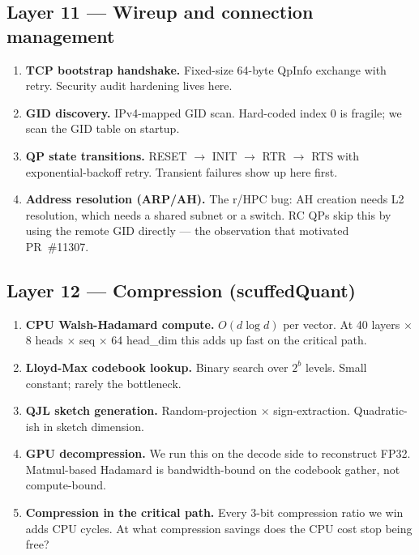 \documentclass[11pt]{article}
\begin{document}
\subsection*{Layer 11 --- Wireup and connection management}
\begin{enumerate}[resume]
\item \textbf{TCP bootstrap handshake.} Fixed-size 64-byte QpInfo
exchange with retry. Security audit hardening lives here.
\item \textbf{GID discovery.} IPv4-mapped GID scan. Hard-coded
index 0 is fragile; we scan the GID table on startup.
\item \textbf{QP state transitions.} RESET $\rightarrow$ INIT
$\rightarrow$ RTR $\rightarrow$ RTS with exponential-backoff retry.
Transient failures show up here first.
\item \textbf{Address resolution (ARP/AH).} The r/HPC bug: AH
creation needs L2 resolution, which needs a shared subnet or a
switch. RC QPs skip this by using the remote GID directly --- the
observation that motivated PR~\#11307.
\end{enumerate}

\subsection*{Layer 12 --- Compression (scuffedQuant)}
\begin{enumerate}[resume]
\item \textbf{CPU Walsh-Hadamard compute.} $O(d \log d)$ per vector.
At 40 layers $\times$ 8 heads $\times$ seq $\times$ 64 head\_dim this
adds up fast on the critical path.
\item \textbf{Lloyd-Max codebook lookup.} Binary search over
$2^b$ levels. Small constant; rarely the bottleneck.
\item \textbf{QJL sketch generation.} Random-projection $\times$
sign-extraction. Quadratic-ish in sketch dimension.
\item \textbf{GPU decompression.} We run this on the decode side to
reconstruct FP32. Matmul-based Hadamard is bandwidth-bound on the
codebook gather, not compute-bound.
\item \textbf{Compression in the critical path.} Every 3-bit
compression ratio we win adds CPU cycles. At what compression savings
does the CPU cost stop being free?
\end{enumerate}
\end{document}
